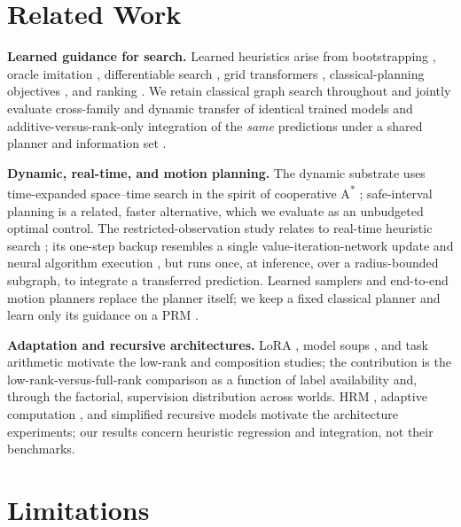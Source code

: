 \documentclass[letterpaper]{article} %
\begin{document}
\section{Related Work}

\textbf{Learned guidance for search.} Learned heuristics arise from bootstrapping \citep{arfaee2011bootstrap}, oracle imitation \citep{bhardwaj2017sail}, differentiable search \citep{yonetani2021neuralastar}, grid transformers \citep{kirilenko2023transpath}, classical-planning objectives \citep{ferber2020neural}, and ranking \citep{chrestien2023rank}. We retain classical graph search throughout and jointly evaluate cross-family and dynamic transfer of identical trained models and additive-versus-rank-only integration of the \emph{same} predictions under a shared planner and information set \citep{pohl1970,pearl1982semiadmissible,aine2016mha}.

\textbf{Dynamic, real-time, and motion planning.} The dynamic substrate uses time-expanded space--time search in the spirit of cooperative A\textsuperscript{*} \citep{silver2005cooperative}; safe-interval planning \citep{phillips2011sipp} is a related, faster alternative, which we evaluate as an unbudgeted optimal control. The restricted-observation study relates to real-time heuristic search \citep{korf1990rta,koenig2006rtaa}; its one-step backup resembles a single value-iteration-network update \citep{tamar2016vin,lee2018gppn} and neural algorithm execution \citep{velickovic2021nar}, but runs once, at inference, over a radius-bounded subgraph, to integrate a transferred prediction. Learned samplers and end-to-end motion planners \citep{ichter2018sampling,qureshi2019mpnet} replace the planner itself; we keep a fixed classical planner and learn only its guidance on a PRM \citep{kavraki1996prm}.

\textbf{Adaptation and recursive architectures.} LoRA \citep{hu2021lora}, model soups \citep{wortsman2022soups}, and task arithmetic \citep{ilharco2022task} motivate the low-rank and composition studies; the contribution is the low-rank-versus-full-rank comparison as a function of label availability and, through the factorial, supervision distribution across worlds. HRM \citep{wang2025hrm}, adaptive computation \citep{graves2016act,banino2021pondernet}, and simplified recursive models \citep{jolicoeur2025trm} motivate the architecture experiments; our results concern heuristic regression and integration, not their benchmarks.

\section{Limitations}
\end{document}
